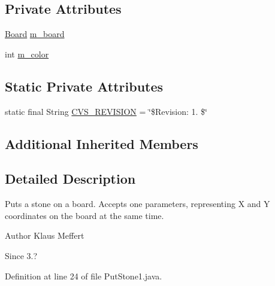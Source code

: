 \subsection*{Private Attributes}
\begin{DoxyCompactItemize}
\item 
\hyperlink{classexamples_1_1gp_1_1tictactoe_1_1_board}{Board} \hyperlink{classexamples_1_1gp_1_1tictactoe_1_1_put_stone1_a1d3c58f3ff83cdce77bdf261ef789342}{m\-\_\-board}
\item 
int \hyperlink{classexamples_1_1gp_1_1tictactoe_1_1_put_stone1_a84ab709b5107b7202e796b3b8233188c}{m\-\_\-color}
\end{DoxyCompactItemize}
\subsection*{Static Private Attributes}
\begin{DoxyCompactItemize}
\item 
static final String \hyperlink{classexamples_1_1gp_1_1tictactoe_1_1_put_stone1_a9559586f73c4cacc7cd2ef02355bde58}{C\-V\-S\-\_\-\-R\-E\-V\-I\-S\-I\-O\-N} = \char`\"{}\$Revision\-: 1. \$\char`\"{}
\end{DoxyCompactItemize}
\subsection*{Additional Inherited Members}


\subsection{Detailed Description}
Puts a stone on a board. Accepts one parameters, representing X and Y coordinates on the board at the same time.

\begin{DoxyAuthor}{Author}
Klaus Meffert 
\end{DoxyAuthor}
\begin{DoxySince}{Since}
3.? 
\end{DoxySince}


Definition at line 24 of file Put\-Stone1.\-java.



